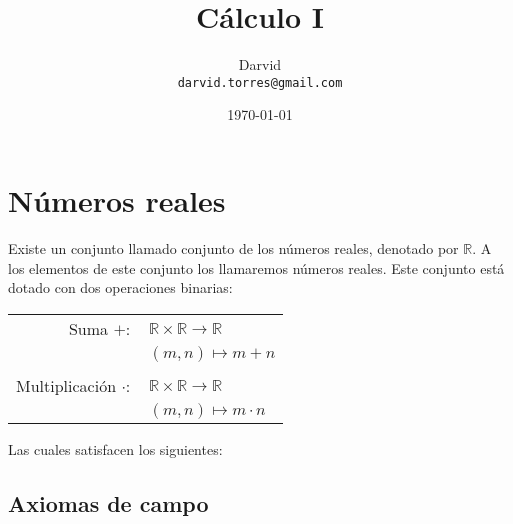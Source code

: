 \documentclass[11pt]{article}
\begin{document}
\title{\vspace{-2cm}Cálculo I}
\author{Darvid \\ \texttt{darvid.torres@gmail.com}}
\date{\today}
\maketitle
\thispagestyle{empty}

\section*{Números reales}

Existe un conjunto llamado conjunto de los números reales, denotado por $\mathbb{R}$. A los elementos de este conjunto los llamaremos números reales. Este conjunto está dotado con dos operaciones binarias:

\begin{center} \begin{tabular}{rl}
    Suma $+:$ & $ \mathbb{R} \times \mathbb{R} \to \mathbb{R} $ \\
    & $ (m, n) \mapsto m+n $\\
    \\
    Multiplicación $\cdot:$ & $ \mathbb{R} \times \mathbb{R} \to \mathbb{R} $ \\
    & $ (m, n) \mapsto m\cdot n $
\end{tabular} \end{center}

Las cuales satisfacen los siguientes:

\subsection*{Axiomas de campo}
\end{document}
